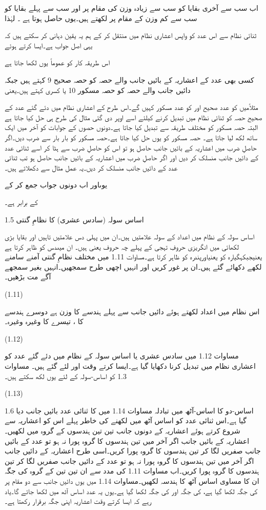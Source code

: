 اب سب سے آخری بقایا کو سب سے زیادہ وزن کی مقام پر اور سب سے پہلے بقایا کو سب سے کم وزن کے مقام پر لکھتے ہیں۔یوں حاصل ہوتا ہے ۔
	لہٰذا
 

 ثنائی نظام سے اس عدد کو واپس اعشاری نظام میں منتقل کر کے ہم یہ یقین دہانی کر سکتے ہیں کہ یہی اصل جواب ہے۔ایسا کرتے ہوئے



اس طریقہ کار کو عموماً یوں لکھا جاتا ہے


	کسی بھی عدد کے اعشاریہ کے بائیں جانب والے حصہ کو حصہ صحیح 9 کہتے ہیں جبکہ دائیں جانب والے حصہ کو حصہ مسکور 10  یا کسری کہتے ہیں۔یعنی



مثلاًمیں  کو عدد صحیح اور کو عدد مسکور کہیں گے۔اس طرح کے اعشاری نظام میں دئے گئے عدد کے صحیح حصہ کو ثنائی نظام میں تبدیل کرنے کیلئے اسے اوپر دی گئی مثال کی طرح ہی حل کیا جاتا ہے البتہ حصہ مسکور کو مختلف طریقہ سے تبدیل کیا جاتا ہے۔دونوں حصوں کے جوابات کو آخر میں ایک ساتھ لکھ لیا جاتا ہے۔
	حصہ مسکور کو یوں حل کیا جاتا ہے۔حصہ مسکور کو بار بار  سے ضرب دیں۔اگر حاصلِ ضرب میں اعشاریہ کے بائیں جانب حاصل ہو تو اس  کو حاصلِ ضرب سے ہٹا کر اسے ثنائی عدد کے دائیں جانب منسلک کر دیں اور اگر حاصلِ ضرب میں اعشاریہ کے بائیں جانب  حاصل ہو تب ثنائی عدد کے دائیں جانب  منسلک کر دیں۔یہ عمل مثال سے دکھلاتے ہیں۔



یوںاور اب دونوں جواب جمع کر کے


کے برابر ہے۔

1.5 اساس سولہ  (سادس عشری) کا نظامِ گنتی

	اساس سولہ کے نظام میں اعداد کے سولہ علامتیں ہیں۔ان میں پہلی دس علامتیں تاہیں اور بقایا بڑی لکھائی میں انگریزی حروفِ تہجی کے پہلے چہ حروف یعنی   ہیں۔ ان میںدس کو ظاہر کرتا ہے یعنیجبکہگیارہ کو یعنیاورپندرہ کو ظاہر کرتا ہے۔مساوات 1.11 میں مختلف نظامِ گنتی آمنے سامنے لکھے دکھائے گئے ہیں۔ان پر غور کریں اور انہیں اچھی طرح سمجھیں۔انہیں بغیر سمجھے آگے مت بڑھیں۔  

 
(1.11)

	اس نظام میں اعداد لکھتے ہوئے دائیں جانب سے پہلے ہندسے کا وزن   ہے دوسرے ہندسے کا  ، تیسرے کا  وغیرہ وغیرہ۔ 


 
(1.12)

مساوات 1.12 میں سادس عشری یا اساس سولہ کے نظام میں دئے گئے عدد کو اعشاری نظام میں تبدیل کرنا دکھایا گیا ہے۔ایسا کرتے وقت اور لئے گئے ہیں۔
	مساوات 1.3 کو اساس-سولہ کے لئے یوں لکھ سکتے ہیں۔

 
(1.13)

1.6 اساس-دو کا اساس-آٹھ میں تبادلہ
	مساوات 1.14 میں    کا ثنائی عدد بائیں جانب دیا گیا ہے۔اس ثنائی عدد کو اساس آٹھ میں لکھنے کی خاطر پہلے اس کو اعشاریہ سے شروع کرتے ہوئے اعشاریہ کے دونوں جانب تین تین ہندسوں کے گروہ میں لکھیں۔اعشاریہ کے بائیں جانب اگر آخر میں تین ہندسوں کا گروہ پورا نہ ہو تو عدد کے بائیں جانب صفریں لگا کر تین ہندسوں کا گروہ  پورا کریں۔اسی طرح اعشاریہ کے دائیں جانب اگر آخر میں تین ہندسوں کا گروہ پورا نہ ہو تو عدد کے دائیں جانب صفریں لگا کر تین ہندسوں کا گروہ پورا کریں۔اب مساوات 1.11 کی مدد سے ان تین تین کے گروہ کی جگہ ان کا مساوی اساس آٹھ کا ہندسہ لکھیں۔مساوات 1.14 میں یوں دائیں جانب سے  دو مقام پر کی جگہ لکھا گیا ہے،   کی جگہ   اور   کی جگہ   لکھا گیا ہے۔یوں یہ عدد اساس آٹھ میں   لکھا جائے گا۔یاد رہے کہ ایسا کرتے وقت اعشاریہ اپنی جگہ برقرار رکھتا ہے۔

